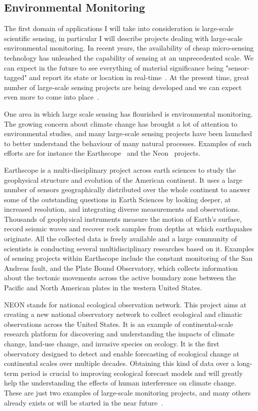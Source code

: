 \subsection{Environmental Monitoring}
\label{envmon}

The first domain of applications I will take into consideration is large-scale scientific sensing, in
particular I will describe projects dealing with large-scale environmental monitoring.  In recent years,
the availability of cheap micro-sensing technology has unleashed the capability of sensing at an
unprecedented scale. We can expect in the future to see everything of material significance being
"sensor-tagged" and report its state or location in
real-time~\cite{irisnet,qpsn,stream-processing-challanges}. At the present time, great number of
large-scale sensing projects are being developed and we can expect even more to come into
place~\cite{earthscope,neon,casa-lead,swissexp}.

One area in which large scale sensing has flourished is environmental monitoring. The growing concern
about climate change has brought a lot of attention to environmental studies, and many large-scale
sensing projects have been launched to better understand the behaviour of many natural processes.
Examples of such efforts are for instance the Earthscope~\cite{earthscope} and the Neon~\cite{neon}
projects.

Earthscope is a multi-disciplinary project across earth sciences to study the geophysical structure and
evolution of the American continent. It uses a large number of sensors geographically distributed over
the whole continent to answer some of the outstanding questions in Earth Sciences by looking deeper, at
increased resolution, and integrating diverse measurements and observations. Thousands of geophysical
instruments measure the motion of Earth's surface, record seismic waves and recover rock samples from
depths at which earthquakes originate. All the collected data is freely available and a large community
of scientists is conducting several multidisciplinary researches based on it. Examples of sensing
projects within Earthscope include the constant monitoring of the San Andreas fault, and the Plate Bound
Observatory, which collects information about the tectonic movements across the active boundary zone
between the Pacific and North American plates in the western United States.

NEON stands for national ecological observation network. This project aims at creating a new national
observatory network to collect ecological and climatic observations across the United States. It is an
example of continental-scale research platform for discovering and understanding the impacts of climate
change, land-use change, and invasive species on ecology. It is the first observatory designed to detect
and enable forecasting of ecological change at continental scales over multiple decades. Obtaining this
kind of data over a \mbox{long-term} period is crucial to improving ecological forecast models and will
greatly help the understanding the effects of human interference on climate change.  These are just two
examples of large-scale monitoring projects, and many others already exists or will be started in the
near future~\cite{testban,skysurvey,neon,usvo}.

